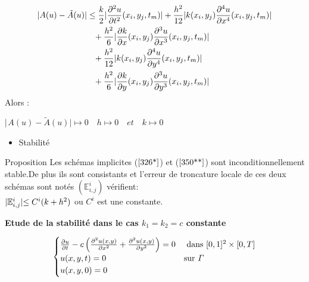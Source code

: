 \documentclass[12pt]{beamer}
\begin{document}
	\begin{frame}
	  \begin{align*}
	 \arrowvert A(u)-\tilde{A}(u)\rvert &\leq\frac{k}{2}\arrowvert\frac{\partial^{2}{u}}{\partial{t}^{2}}(x_{i},y_{j},t_{m})\rvert +\frac{h^{2}}{12}\arrowvert k(x_{i},y_{j})\frac{\partial^{4}{u}}{\partial{x^{4}}}(x_{i},y_{j},t_{m})\rvert\\&\phantom{=}+\frac{h^{2}}{6}\arrowvert\frac{\partial{k}}{\partial{x}}(x_{i},y_{j})\frac{\partial^{3}{u}}{\partial{x^{3}}}(x_{i},y_{j},t_{m})\rvert\\&\phantom{=}+\frac{h^{2}}{12}\arrowvert k(x_{i},y_{j})\frac{\partial^{4}{u}}{\partial{y^{4}}}(x_{i},y_{j},t_{m})\rvert\\&\phantom{=}+\frac{h^{2}}{6}\arrowvert\frac{\partial{k}}{\partial{y}}(x_{i},y_{j})\frac{\partial^{3}{u}}{\partial{y^{3}}}(x_{i},y_{j},t_{m})\rvert
	 \end{align*}
	 Alors : \begin{center}
	 	$	\arrowvert$${A(u)-\tilde{A}(u)}$$\rvert \longmapsto 0 \quad h\longmapsto 0 \quad et \quad k\longmapsto 0$
	 \end{center}
	\end{frame}
	\begin{frame}
	\begin{itemize}
		[triangle]
		\item Stabilit\'{e}
	\end{itemize}
	\begin{block}{Proposition}
		Les sch\'{e}mas implicites ($\ref{326*}$) et ($\ref{350**}$) sont inconditionnellement stable.De plus ils sont consistants et l'erreur de troncature locale de ces deux sch\'{e}mas sont not\'{e}s $(\mathbb{E}^{i}_{i,j})$ v\'{e}rifient:\\
		$\arrowvert\mathbb{E}^{i}_{i,j}\lvert\leq C^{i}(k+h^{2})$ ou $C^{i}$ est une constante.
	\end{block}
	\textbf{Etude de la stabilit\'{e} dans le cas $k_{1}=k_{2}=c$ constante}
	\begin{block}{}
	      \begin{equation}
		\begin{cases}
		\frac{\partial{u}}{\partial{t}}-c\left( \frac{\partial^{2}{u}(x,y)}{\partial{x^{2}}}+\frac{\partial^{2}{u}(x, y)}{\partial{y^{2}}}\right) =0 & \text{ dans $ [0,1]^{2}\times[0,T]$}\\
		u(x,y,t)=0 & \text{sur $\varGamma $ }\\
		u(x,y,0)=0   
		\end{cases}\end{equation}
	\end{block}
\end{frame}
\end{document}
